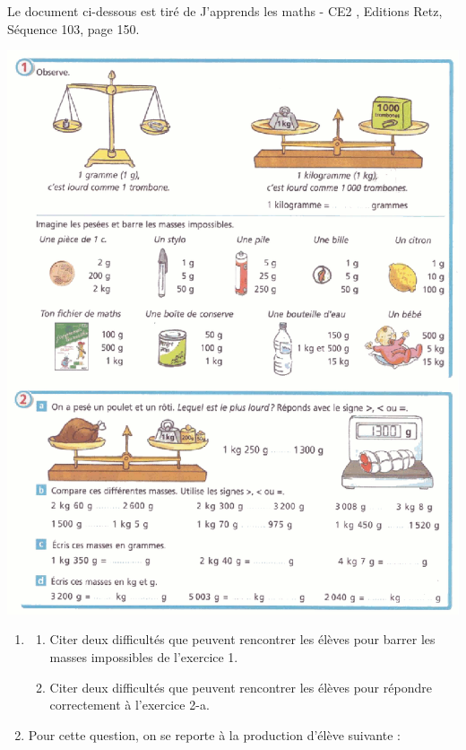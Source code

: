 {%
\begin{exercice}[CRPE 2009 G4]
Le document ci-dessous est tiré de \og J'apprends les maths - CE2 \fg, Editions Retz, Séquence 103, page 150.
\begin{center}
   \includegraphics[width=15cm]{Grandeurs_mesures_did/Images/Grm7_analyse_masse_sujet}
\end{center}
\begin{enumerate}
   \item 
   \begin{enumerate}
      \item Citer deux difficultés que peuvent rencontrer les élèves pour barrer les masses impossibles de l'exercice 1.
      \item Citer deux difficultés que peuvent rencontrer les élèves pour répondre correctement à l'exercice 2-a.
   \end{enumerate}
   \pagebreak
   \item Pour cette question, on se reporte à la production d'élève suivante :
   \begin{center}

\end{center}
\end{enumerate}
\end{exercice}}
